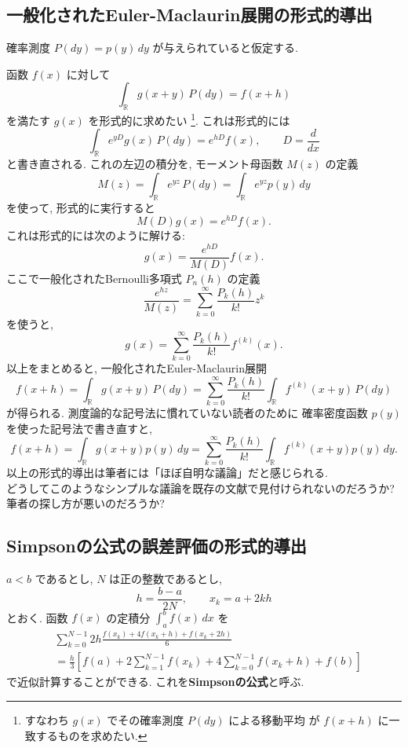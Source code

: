 \documentclass[12pt,twoside]{jarticle}
\newcommand\BF{\bfseries}
\newcommand\R{{\mathbb R}} %
\newcommand\PM{P} %
\newcommand\PDF{p} %
\theoremstyle{jplain}
\theoremstyle{jplain}
\theoremstyle{jplain}
\numberwithin{theorem}{section}
\numberwithin{equation}{section}
\numberwithin{figure}{section}
\numberwithin{table}{section}
\begin{document}

\subsection{一般化されたEuler-Maclaurin展開の形式的導出}
\label{sec:formal-GEM}

確率測度 $\PM(dy)=\PDF(y)\,dy$ が与えられていると仮定する.

函数 $f(x)$ に対して
\[
  \int_\R g(x+y)\,\PM(dy) = f(x+h)
\]
を満たす $g(x)$ を形式的に求めたい%
\footnote{すなわち $g(x)$ でその確率測度 $\PM(dy)$ による移動平均
が $f(x+h)$ に一致するものを求めたい.}.
これは形式的には
\[
  \int_\R e^{yD} g(x)\,\PM(dy) = e^{hD}f(x),
  \qquad
  D = \frac{d}{dx}
\]
と書き直される. これの左辺の積分を, モーメント母函数 $M(z)$ の定義
\[
  M(z) = \int_\R e^{yz}\,\PM(dy) = \int_\R e^{yz}\PDF(y)\,dy
\]
を使って, 形式的に実行すると
\[
  M(D)g(x) = e^{hD}f(x).
\]
これは形式的には次のように解ける:
\[
  g(x) = \frac{e^{hD}}{M(D)}f(x).
\]
ここで一般化されたBernoulli多項式 $P_n(h)$ の定義
\[
  \frac{e^{hz}}{M(z)} = \sum_{k=0}^\infty \frac{P_k(h)}{k!}z^k
\]
を使うと,
\[
  g(x) = \sum_{k=0}^\infty \frac{P_k(h)}{k!}f^{(k)}(x).
\]
以上をまとめると, 一般化されたEuler-Maclaurin展開
\[
  f(x+h)
  = \int_\R g(x+y)\,\PM(dy)
  = \sum_{k=0}^\infty \frac{P_k(h)}{k!} \int_\R f^{(k)}(x+y)\,\PM(dy)
\]
が得られる. 測度論的な記号法に慣れていない読者のために
確率密度函数 $\PDF(y)$ を使った記号法で書き直すと,
\[
  f(x+h)
  = \int_\R g(x+y)\PDF(y)\,dy
  = \sum_{k=0}^\infty \frac{P_k(h)}{k!} \int_\R f^{(k)}(x+y)\PDF(y)\,dy.
\]
以上の形式的導出は筆者には「ほぼ自明な議論」だと感じられる.\\
どうしてこのようなシンプルな議論を既存の文献で見付けられないのだろうか?\\
筆者の探し方が悪いのだろうか?


\subsection{Simpsonの公式の誤差評価の形式的導出}
\label{sec:formal-Simpson}

$a<b$ であるとし, $N$ は正の整数であるとし,
\[
  h = \frac{b-a}{2N}, \qquad x_k = a+2kh
\]
とおく. 函数 $f(x)$ の定積分 $\int_a^b f(x)\,dx$ を
\begin{align*}
  &
  \sum_{k=0}^{N-1}2h\frac{f(x_k)+4f(x_k+h)+f(x_k+2h)}{6}
  \\ &
  =\frac{h}{3}\left[
  f(a)+2\sum_{k=1}^{N-1}f(x_k)+4\sum_{k=0}^{N-1}f(x_k+h)+f(b)
  \right]
\end{align*}
で近似計算することができる. これを{\BF Simpsonの公式}と呼ぶ.
\end{document}
